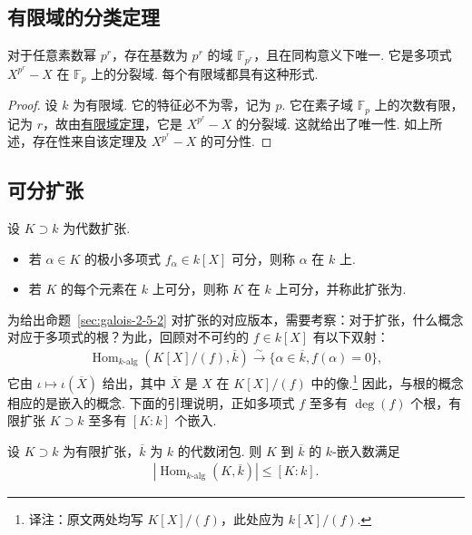 \subsection{有限域的分类定理}\label{sec:galois-2-5-3}
\begin{theorem*}
对于任意素数幂 $p^r$，存在基数为 $p^r$ 的域 $\mathbb F_{p^r}$，且在同构意义下唯一. 它是多项式 $X^{p^r}-X$ 在 $\mathbb F_p$ 上的分裂域. 每个有限域都具有这种形式.
\end{theorem*}
\begin{proof}
设 $k$ 为有限域. 它的特征必不为零，记为 $p$. 它在素子域 $\mathbb F_p$ 上的次数有限，记为 $r$，故由\hyperref[sec:galois-2-4-4]{有限域定理}，它是 $X^{p^r}-X$ 的分裂域. 这就给出了唯一性. 如上所述，存在性来自该定理及 $X^{p^r}-X$ 的可分性.
\end{proof}
\subsection{可分扩张}\label{sec:galois-2-5-4}
\begin{definition*}
设 $K\supset k$ 为代数扩张.
\begin{itemize}
\item 若 $\alpha\in K$ 的极小多项式 $f_\alpha\in k[X]$ 可分，则称 $\alpha$ 在 $k$ 上.
\item 若 $K$ 的每个元素在 $k$ 上可分，则称 $K$ 在 $k$ 上可分，并称此扩张为.
\end{itemize}
\end{definition*}
为给出命题~\ref{sec:galois-2-5-2} 对扩张的对应版本，需要考察：对于扩张，什么概念对应于多项式的根？为此，回顾对不可约的 $f\in k[X]$ 有以下双射：
\begin{align*}
\operatorname{Hom}_{k\text{-alg}}(K[X]/(f),\overline k)\xrightarrow{\sim}\{\alpha\in\overline k,f(\alpha)=0\},
\end{align*}
它由 $\iota\mapsto\iota(\overline X)$ 给出，其中 $\overline X$ 是 $X$ 在 $K[X]/(f)$ 中的像.\footnote{译注：原文两处均写 $K[X]/(f)$，此处应为 $k[X]/(f)$.} 因此，与根的概念相应的是嵌入的概念. 下面的引理说明，正如多项式 $f$ 至多有 $\deg(f)$ 个根，有限扩张 $K\supset k$ 至多有 $[K:k]$ 个嵌入.
\begin{proposition*}
设 $K\supset k$ 为有限扩张，$\overline k$ 为 $k$ 的代数闭包. 则 $K$ 到 $\overline k$ 的 $k$-嵌入数满足
\begin{align*}
|\operatorname{Hom}_{k\text{-alg}}(K,\overline k)|\leqslant[K:k].
\end{align*}
\end{proposition*}
